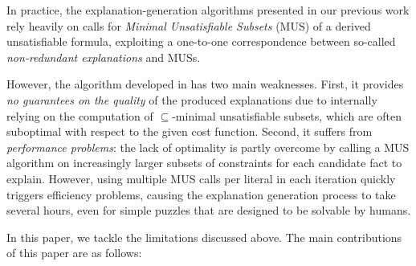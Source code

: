 \documentclass{llncs}
\begin{document}
In practice, the explanation-generation algorithms presented in our previous work rely heavily on calls for \emph{Minimal Unsatisfiable Subsets} (MUS) \cite{marques2010minimal} of a derived unsatisfiable formula, exploiting a one-to-one correspondence between so-called \emph{non-redundant explanations} and MUSs. 

However, the algorithm developed in \cite{ecai/BogaertsGCG20} has two main weaknesses.
First, it provides \emph{no guarantees on the quality} of the produced explanations due to internally relying on the computation of $\subseteq$-minimal unsatisfiable subsets, which are often suboptimal with respect to the given cost function. 
Second, it suffers from \emph{performance problems}: the lack of optimality is partly overcome by calling a MUS algorithm on increasingly larger subsets of constraints for each candidate fact to explain.
However, using multiple MUS calls per literal in each iteration quickly triggers efficiency problems, causing the explanation generation process to take several hours, even for simple puzzles that are designed to be solvable by humans.

In this paper, we tackle the limitations discussed above. The main contributions of this paper are as follows:
\end{document}
